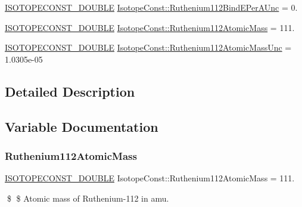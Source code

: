 \begin{DoxyCompactItemize}
\mbox{\hyperlink{group___isotope_const-_macros_ga8f45a7272ce02c0b4c65c44636ed719a}{I\+S\+O\+T\+O\+P\+E\+C\+O\+N\+S\+T\+\_\+\+D\+O\+U\+B\+LE}} \mbox{\hyperlink{group___isotope_const-_ruthenium-_ru112_ga3af1dcd9dfac0c25ac4cbcc45d26469a}{Isotope\+Const\+::\+Ruthenium112\+Bind\+E\+Per\+A\+Unc}} = 0.
\item 
\mbox{\hyperlink{group___isotope_const-_macros_ga8f45a7272ce02c0b4c65c44636ed719a}{I\+S\+O\+T\+O\+P\+E\+C\+O\+N\+S\+T\+\_\+\+D\+O\+U\+B\+LE}} \mbox{\hyperlink{group___isotope_const-_ruthenium-_ru112_ga0f58e37841d475971e1afe87f98eaefd}{Isotope\+Const\+::\+Ruthenium112\+Atomic\+Mass}} = 111.
\item 
\mbox{\hyperlink{group___isotope_const-_macros_ga8f45a7272ce02c0b4c65c44636ed719a}{I\+S\+O\+T\+O\+P\+E\+C\+O\+N\+S\+T\+\_\+\+D\+O\+U\+B\+LE}} \mbox{\hyperlink{group___isotope_const-_ruthenium-_ru112_gaecbe97bf1f58f947810a89da35404758}{Isotope\+Const\+::\+Ruthenium112\+Atomic\+Mass\+Unc}} = 1.\+0305e-\/05
\end{DoxyCompactItemize}


\subsection{Detailed Description}


\subsection{Variable Documentation}
\mbox{\label{group___isotope_const-_ruthenium-_ru112_ga0f58e37841d475971e1afe87f98eaefd}} 
\subsubsection{\texorpdfstring{Ruthenium112\+Atomic\+Mass}{Ruthenium112AtomicMass}}
{\footnotesize\ttfamily \mbox{\hyperlink{group___isotope_const-_macros_ga8f45a7272ce02c0b4c65c44636ed719a}{I\+S\+O\+T\+O\+P\+E\+C\+O\+N\+S\+T\+\_\+\+D\+O\+U\+B\+LE}} Isotope\+Const\+::\+Ruthenium112\+Atomic\+Mass = 111.}

\$ \$ Atomic mass of Ruthenium-\/112 in amu. \mbox{\label{group___isotope_const-_ruthenium-_ru112_gaecbe97bf1f58f947810a89da35404758}} 
